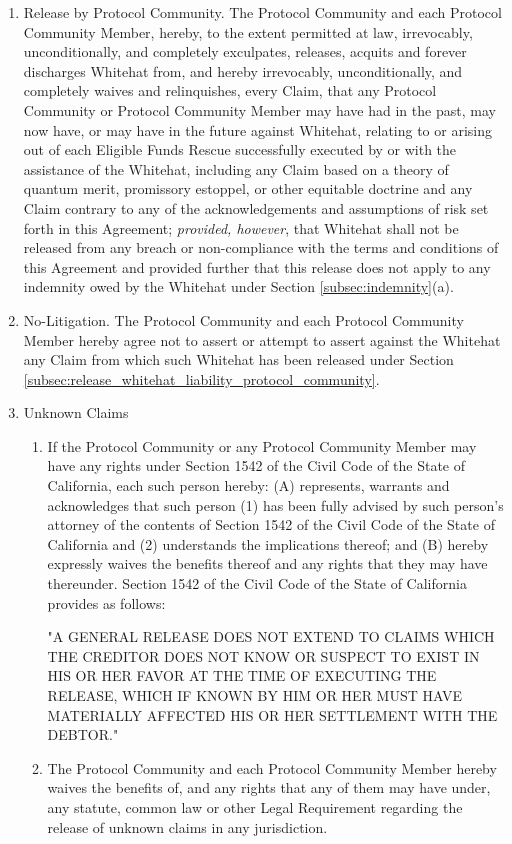 \documentclass{article}
\begin{document}
\begin{enumerate}
    \item Release by Protocol Community. The Protocol Community and each Protocol Community Member, hereby, to the extent permitted at law, irrevocably, unconditionally, and completely exculpates, releases, acquits and forever discharges Whitehat from, and hereby irrevocably, unconditionally, and completely waives and relinquishes, every Claim, that any Protocol Community or Protocol Community Member may have had in the past, may now have, or may have in the future against Whitehat, relating to or arising out of each Eligible Funds Rescue successfully executed by or with the assistance of the Whitehat, including any Claim based on a theory of quantum merit, promissory estoppel, or other equitable doctrine and any Claim contrary to any of the acknowledgements and assumptions of risk set forth in this Agreement; \textit{provided, however}, that Whitehat shall not be released from any breach or non-compliance with the terms and conditions of this Agreement and provided further that this release does not apply to any indemnity owed by the Whitehat under Section \ref{subsec:indemnity}(a).

    \item No-Litigation. The Protocol Community and each Protocol Community Member hereby agree not to assert or attempt to assert against the Whitehat any Claim from which such Whitehat has been released under Section \ref{subsec:release_whitehat_liability_protocol_community}.

    \item Unknown Claims

          \begin{enumerate}

              \item If the Protocol Community or any Protocol Community Member may have any rights under Section 1542 of the Civil Code of the State of California, each such person hereby: (A) represents, warrants and acknowledges that such person (1) has been fully advised by such person's attorney of the contents of Section 1542 of the Civil Code of the State of California and (2) understands the implications thereof; and (B) hereby expressly waives the benefits thereof and any rights that they may have thereunder. Section 1542 of the Civil Code of the State of California provides as follows:

                    "A GENERAL RELEASE DOES NOT EXTEND TO CLAIMS WHICH THE CREDITOR DOES NOT KNOW OR SUSPECT TO EXIST IN HIS OR HER FAVOR AT THE TIME OF EXECUTING THE RELEASE, WHICH IF KNOWN BY HIM OR HER MUST HAVE MATERIALLY AFFECTED HIS OR HER SETTLEMENT WITH THE DEBTOR."

              \item The Protocol Community and each Protocol Community Member hereby waives the benefits of, and any rights that any of them may have under, any statute, common law or other Legal Requirement regarding the release of unknown claims in any jurisdiction.

          \end{enumerate}
\end{enumerate}
\end{document}
